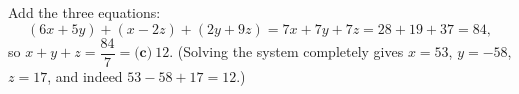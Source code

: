 Add the three equations:
\[
(6x+5y)+(x-2z)+(2y+9z)=7x+7y+7z=28+19+37=84 ,
\]
so $x+y+z=\dfrac{84}{7}=\boxed{\textbf{(c)}\ 12}$. (Solving the system completely gives $x=53$, $y=-58$, $z=17$, and indeed $53-58+17=12$.)
